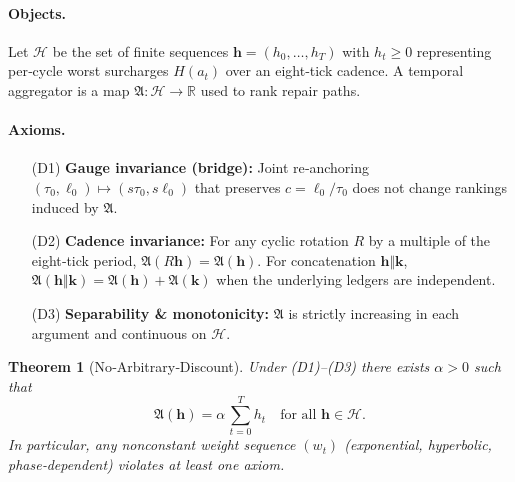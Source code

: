 \documentclass[11pt]{article}
\newtheorem{theorem}{Theorem}[section]
\begin{document}
\paragraph{Objects.}
Let $\mathcal{H}$ be the set of finite sequences $\mathbf{h}=(h_0,\dots,h_T)$ with $h_t\ge 0$ representing per‑cycle worst surcharges $H(a_t)$ over an eight‑tick cadence. A temporal aggregator is a map $\mathfrak{A}\!:\mathcal{H}\to\mathbb{R}$ used to rank repair paths.

\paragraph{Axioms.}
\begin{enumerate}
\item[(D1)] \textbf{Gauge invariance (bridge):} Joint re‑anchoring $(\tau_0,\ell_0)\mapsto(s\tau_0,s\ell_0)$ that preserves $c=\ell_0/\tau_0$ does not change rankings induced by $\mathfrak{A}$.
\item[(D2)] \textbf{Cadence invariance:} For any cyclic rotation $R$ by a multiple of the eight‑tick period, $\mathfrak{A}(R\mathbf{h})=\mathfrak{A}(\mathbf{h})$. For concatenation $\mathbf{h}\Vert\mathbf{k}$, $\mathfrak{A}(\mathbf{h}\Vert\mathbf{k})=\mathfrak{A}(\mathbf{h})+\mathfrak{A}(\mathbf{k})$ when the underlying ledgers are independent.
\item[(D3)] \textbf{Separability \& monotonicity:} $\mathfrak{A}$ is strictly increasing in each argument and continuous on $\mathcal{H}$.
\end{enumerate}

\begin{theorem}[No‑Arbitrary‑Discount]
Under \textup{(D1)–(D3)} there exists $\alpha>0$ such that
\[
\mathfrak{A}(\mathbf{h})=\alpha\,\sum_{t=0}^T h_t \quad \text{for all }\mathbf{h}\in\mathcal{H}.
\]
In particular, any nonconstant weight sequence $(w_t)$ (exponential, hyperbolic, phase‑dependent) violates at least one axiom.
\end{theorem}
\end{document}
